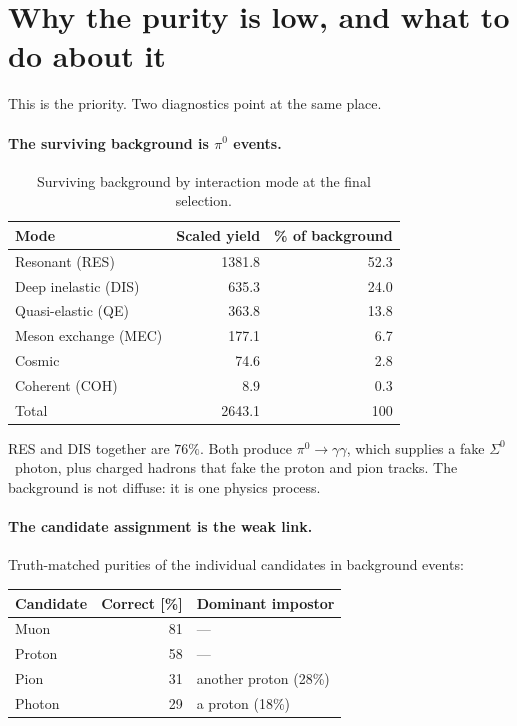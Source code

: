 \documentclass[11pt,a4paper]{article}
\newcommand{\Szero}{\ensuremath{\Sigma^{0}}}
\begin{document}
\section{Why the purity is low, and what to do about it}
\label{sec:purity}

This is the priority. Two diagnostics point at the same place.

\paragraph{The surviving background is $\pi^0$ events.}
\begin{table}[h]\centering
\caption{Surviving background by interaction mode at the final selection.}
\begin{tabular}{lrr}
\toprule
Mode & Scaled yield & \% of background \\
\midrule
Resonant (RES)       & 1381.8 & 52.3 \\
Deep inelastic (DIS) &  635.3 & 24.0 \\
Quasi-elastic (QE)   &  363.8 & 13.8 \\
Meson exchange (MEC) &  177.1 &  6.7 \\
Cosmic               &   74.6 &  2.8 \\
Coherent (COH)       &    8.9 &  0.3 \\
\midrule
Total                & 2643.1 & 100 \\
\bottomrule
\end{tabular}
\end{table}

\noindent RES and DIS together are $76\%$. Both produce $\pi^0 \to \gamma\gamma$,
which supplies a fake \Szero\ photon, plus charged hadrons that fake the proton and
pion tracks. The background is not diffuse: it is one physics process.

\paragraph{The candidate assignment is the weak link.} Truth-matched purities of
the individual candidates in background events:

\begin{center}
\begin{tabular}{lrl}
\toprule
Candidate & Correct [\%] & Dominant impostor \\
\midrule
Muon   & 81 & --- \\
Proton & 58 & --- \\
Pion   & 31 & another proton (28\%) \\
Photon & 29 & a proton (18\%) \\
\bottomrule
\end{tabular}
\end{center}
\end{document}

